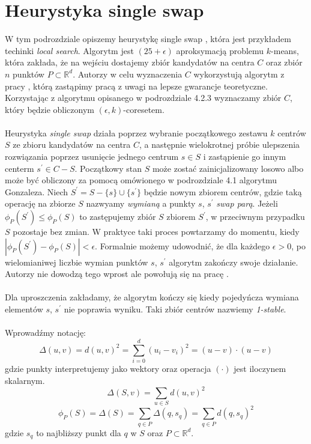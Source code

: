 \section{Heurystyka single swap}

W tym podrozdziale opiszemy heurystykę single swap \cite{Arya2004LocalSH}, która jest przykładem techinki \textit{local search}.
Algorytm jest $(25 + \epsilon)$ aproksymacją problemu $k$-means, która zakłada, że na wejściu dostajemy zbiór kandydatów na centra $C$ oraz zbiór $n$ punktów $P \subset \mathbb{R}^d$.
Autorzy \cite{Arya2004LocalSH} w celu wyznaczenia $C$ wykorzystują algorytm z pracy \cite{Matousek99onapproximate}, którą zastąpimy pracą \cite{10.1145/1007352.1007400} z uwagi na lepsze gwarancje teoretyczne.
Korzystając z algorytmu opisanego w podrozdziale 4.2.3 wyznaczamy zbiór $C$, który będzie obliczonym $(\epsilon, k)$-coresetem.
\\~\\
Heurystyka \textit{single swap} działa poprzez wybranie początkowego zestawu $k$ centrów $S$ ze zbioru kandydatów na centra $C$, a następnie wielokrotnej
próbie ulepszenia rozwiązania poprzez usunięcie jednego centrum $s \in S$ i zastąpienie go innym centerm $s^{'} \in C - S$.
Początkowy stan $S$ może zostać zainicjalizowany losowo albo może być obliczony za pomocą omówionego w podrozdziale 4.1 algorytmu Gonzaleza.
Niech $S^{'} = S - \{s\} \cup \{s^{'}\}$ będzie nowym zbiorem centrów, gdzie taką operację na zbiorze $S$ nazwyamy \textit{wymianą} a punkty $s$, $s^{'}$ \textit{swap parą}.
Jeżeli $\phi_{P}(S^{'}) \leq \phi_{P}(S)$ to zastępujemy zbiór $S$ zbiorem $S^{'}$, w przeciwnym przypadku $S$ pozostaje bez zmian.
W praktyce taki proces powtarzamy do momentu, kiedy $|\phi_{P}(S^{'}) - \phi_{P}(S) | < \epsilon$.
Formalnie możemy udowodnić, że dla każdego $\epsilon > 0$, po wielomianiwej liczbie wymian punktów $s$, $s^{'}$ algorytm zakończy swoje działanie.
Autorzy nie dowodzą tego wprost ale powołują się na pracę \cite{10.1145/380752.380755}.
\\~\\
Dla uproszczenia zakładamy, że algorytm kończy się kiedy pojedyńcza wymiana elementów $s$, $s^{'}$ nie poprawia wyniku.
Taki zbiór centrów nazwiemy \textit{1-stable}.
\\~\\
Wprowadźmy notację:
\begin{equation}
    \Delta(u, v) = d(u, v)^{2} = \sum_{i=0}^{d} (u_{i} - v_{i})^2 = (u - v)\cdot(u - v)
\end{equation}
gdzie punkty interpretujemy jako wektory oraz operacja $(\cdot)$ jest iloczynem skalarnym.
\begin{equation}
    \Delta(S, v) = \sum_{u \in S} d(u, v)^{2}
\end{equation}
\begin{equation}
    \phi_{P}(S) = \Delta(S) = \sum_{q \in P} \Delta(q,s_{q}) = \sum_{q \in P} d(q, s_{q})^{2}
\end{equation}
gdzie $s_{q}$ to najbliższy punkt dla $q$ w $S$ oraz $P \subset \mathbb{R}^{d}$. 

